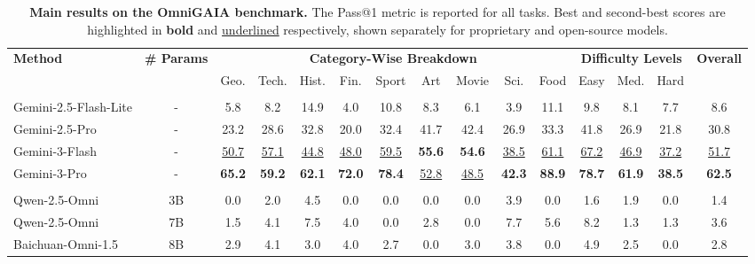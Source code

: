 \begin{table}[!t]
\centering
\caption{\textbf{Main results on the OmniGAIA benchmark.} The Pass@1 metric is reported for all tasks. Best and second-best scores are highlighted in \textbf{bold} and \underline{underlined} respectively, shown separately for proprietary and open-source models.}
\label{tab:omnigaia_results}
\setlength\tabcolsep{4.2pt}
\fontsize{8.2pt}{11.4pt}\selectfont
\begin{tabular}{l c ccccccccc ccc c}
\toprule
\multirow{2}[2]{*}{{\bfseries Method}} &
\multirow{2}[2]{*}{{\bfseries \# Params}} &
\multicolumn{9}{c}{{\bfseries Category-Wise Breakdown}} &
\multicolumn{3}{c}{{\bfseries Difficulty Levels}} &
\multirow{2}[2]{*}{{\bfseries Overall}} \\
\cmidrule(lr){3-11} \cmidrule(lr){12-14}
  & & Geo. & Tech. & Hist. & Fin.
    & Sport & Art & Movie & Sci. & Food
    & Easy & Med. & Hard &  \\
\midrule
\rowcolor[HTML]{f0f0f0}
\multicolumn{15}{c}{{\bfseries\itshape Proprietary Omni-Modal Models}} \\
Gemini-2.5-Flash-Lite
& - & 5.8 & 8.2 & 14.9 & 4.0 & 10.8 & 8.3 & 6.1 & 3.9 & 11.1 & 9.8 & 8.1 & 7.7 & 8.6 \\
Gemini-2.5-Pro
& - & 23.2 & 28.6 & 32.8 & 20.0 & 32.4 & 41.7 & 42.4 & 26.9 & 33.3 & 41.8 & 26.9 & 21.8 & 30.8 \\
Gemini-3-Flash
& - & \underline{50.7} & \underline{57.1} & \underline{44.8} & \underline{48.0}
& \underline{59.5} & {\bfseries 55.6} & {\bfseries 54.6} & \underline{38.5} & \underline{61.1}
& \underline{67.2} & \underline{46.9} & \underline{37.2} & \underline{51.7} \\
Gemini-3-Pro
& - & {\bfseries 65.2} & {\bfseries 59.2} & {\bfseries 62.1} & {\bfseries 72.0}
& {\bfseries 78.4} & \underline{52.8} & \underline{48.5} & {\bfseries 42.3} & {\bfseries 88.9}
& {\bfseries 78.7} & {\bfseries 61.9} & {\bfseries 38.5} & {\bfseries 62.5} \\
\midrule
\rowcolor[HTML]{f0f0f0}
\multicolumn{15}{c}{{\bfseries\itshape Open-Source Omni-Modal Models}} \\
Qwen-2.5-Omni
& 3B & 0.0 & 2.0 & 4.5 & 0.0 & 0.0 & 0.0 & 0.0 & 3.9 & 0.0 & 1.6 & 1.9 & 0.0 & 1.4 \\
Qwen-2.5-Omni
& 7B & 1.5 & 4.1 & 7.5 & 4.0 & 0.0 & 2.8 & 0.0 & 7.7 & 5.6 & 8.2 & 1.3 & 1.3 & 3.6 \\
Baichuan-Omni-1.5
& 8B & 2.9 & 4.1 & 3.0 & 4.0 & 2.7 & 0.0 & 3.0 & 3.8 & 0.0 & 4.9 & 2.5 & 0.0 & 2.8 \\

\end{tabular}
\end{table}
